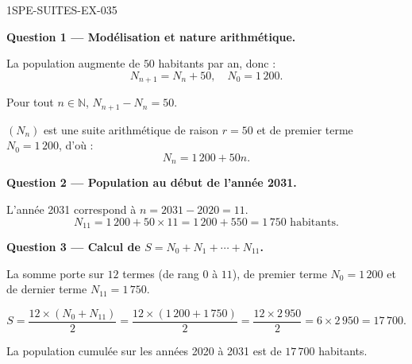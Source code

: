 \begin{corrige}{1SPE-SUITES-EX-035}

\textbf{Question 1 — Modélisation et nature arithmétique.}

La population augmente de $50$ habitants par an, donc :
\[
  N_{n+1} = N_n + 50, \quad N_0 = 1\,200.
\]

Pour tout $n \in \mathbb{N}$, $N_{n+1} - N_n = 50$.


$(N_n)$ est une suite arithmétique de raison $r = 50$ et de premier terme $N_0 = 1\,200$, d'où :
\[
  N_n = 1\,200 + 50n.
\]

\medskip
\textbf{Question 2 — Population au début de l'année 2031.}

L'année 2031 correspond à $n = 2031 - 2020 = 11$.
\[
  N_{11} = 1\,200 + 50 \times 11 = 1\,200 + 550 = 1\,750 \text{ habitants}.
\]

\medskip
\textbf{Question 3 — Calcul de $S = N_0 + N_1 + \cdots + N_{11}$.}

La somme porte sur $12$ termes (de rang $0$ à $11$), de premier terme $N_0 = 1\,200$ et de dernier terme $N_{11} = 1\,750$.


\[
  S = \frac{12 \times (N_0 + N_{11})}{2} = \frac{12 \times (1\,200 + 1\,750)}{2} = \frac{12 \times 2\,950}{2} = 6 \times 2\,950 = 17\,700.
\]

La population cumulée sur les années 2020 à 2031 est de $17\,700$ habitants.


\end{corrige}
